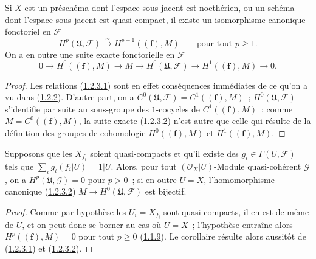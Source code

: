 \begin{proposition}[1.2.3]
\label{III.1.2.3-fr}
Si $X$ est un préschéma dont l'espace sous-jacent est noethérien, ou un
schéma dont l'espace sous-jacent est quasi-compact, il existe un isomorphisme
canonique fonctoriel en $\mathcal F$
\begin{equation}
\label{III.1.2.3.1-fr}
\tag{1.2.3.1}
H^p(\mathfrak U,\mathcal F)\xrightarrow{\sim}H^{p+1}((\mathbf f),M)
\qquad\text{pour tout }p\geq1.
\end{equation}
On a en outre une suite exacte fonctorielle en $\mathcal F$
\begin{equation}
\label{III.1.2.3.2-fr}
\tag{1.2.3.2}
0\longrightarrow H^0((\mathbf f),M)\longrightarrow M
\longrightarrow H^0(\mathfrak U,\mathcal F)
\longrightarrow H^1((\mathbf f),M)\longrightarrow0.
\end{equation}
\end{proposition}

\begin{proof}
Les relations (\hyperref[III.1.2.3.1-fr]{1.2.3.1}) sont en effet conséquences
immédiates de ce qu'on a vu dans (\hyperref[III.1.2.2-fr]{1.2.2}). D'autre
part, on a
$C^0(\mathfrak U,\mathcal F)=C^1((\mathbf f),M)$~;
$H^0(\mathfrak U,\mathcal F)$ s'identifie par suite au sous-groupe des
$1$-cocycles de $C^1((\mathbf f),M)$~; comme
$M=C^0((\mathbf f),M)$, la suite exacte
(\hyperref[III.1.2.3.2-fr]{1.2.3.2}) n'est autre que celle qui résulte de la
définition des groupes de cohomologie $H^0((\mathbf f),M)$ et
$H^1((\mathbf f),M)$.
\end{proof}

\begin{corollary}[1.2.4]
\label{III.1.2.4-fr}
Supposons que les $X_{f_i}$ soient quasi-compacts et qu'il existe des
$g_i\in\Gamma(U,\mathcal F)$ tels que
$\sum_i g_i(f_i\vert U)=1\vert U$. Alors, pour tout
$(\mathcal O_X\vert U)$-Module quasi-cohérent $\mathcal G$, on a
$H^p(\mathfrak U,\mathcal G)=0$ pour $p>0$~; si en outre $U=X$,
l'homomorphisme canonique (\hyperref[III.1.2.3.2-fr]{1.2.3.2})
$M\to H^0(\mathfrak U,\mathcal F)$ est bijectif.
\end{corollary}

\begin{proof}
Comme par hypothèse les $U_i=X_{f_i}$ sont quasi-compacts, il en est de même
de $U$, et on peut donc se borner au cas où $U=X$~; l'hypothèse entraîne alors
$H^p((\mathbf f),M)=0$ pour tout $p\geq0$
(\hyperref[III.1.1.9-fr]{1.1.9}). Le corollaire résulte alors aussitôt de
(\hyperref[III.1.2.3.1-fr]{1.2.3.1}) et
(\hyperref[III.1.2.3.2-fr]{1.2.3.2}).
\end{proof}

